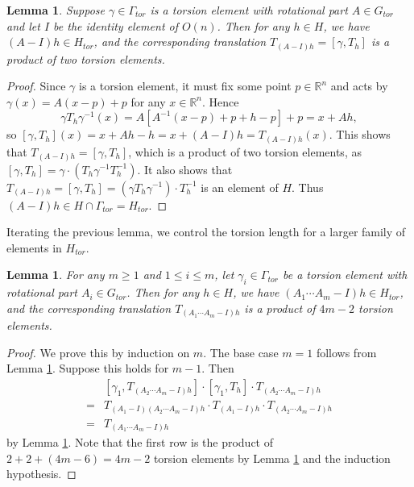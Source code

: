 \documentclass{amsart}
\newtheorem{lemma}[theorem]{Lemma}
\theoremstyle{definition}
\numberwithin{equation}{section}
\theoremstyle{theorem}
\theoremstyle{remark}
\def\R{\mathbb R}
\def\Gt{G_{tor}}
\def\Ht{H_{tor}}
\def\Gat{\Gamma_{tor}}
\begin{document}
	\begin{lemma}\label{lemma: commutator with torsion}
		Suppose $\gamma\in\Gat$ is a torsion element with rotational part $A\in \Gt$ and let $I$ be the identity element of $O(n)$. Then for any $h\in H$, we have $(A-I)h\in \Ht$, and the corresponding translation $T_{(A-I)h}=[\gamma,T_h]$ is a product of two torsion elements.
	\end{lemma}
	\begin{proof}
		Since $\gamma$ is a torsion element, it must fix some point $p\in\R^n$ and acts by
		$\gamma(x)=A(x-p)+p$ for any $x\in\R^n$. Hence
		$$\gamma T_h \gamma^{-1} (x)= A[A^{-1}(x-p) +p+h-p]+p=x+Ah,$$
		so $[\gamma, T_h](x)=x+Ah-h=x+(A-I)h=T_{(A-I)h}(x)$.
		This shows that $T_{(A-I)h}=[\gamma,T_h]$, which is a product of two torsion elements,
		as $[\gamma,T_h]=\gamma\cdot (T_h\gamma^{-1} T_h^{-1})$. 
		It also shows that $T_{(A-I)h}=[\gamma,T_h]=(\gamma T_h \gamma^{-1})\cdot T_h^{-1}$ is an element of $H$.
		Thus $(A-I)h\in H\cap\Gat=\Ht$.
	\end{proof}
	
	Iterating the previous lemma, we control the torsion length for a larger family of elements in $\Ht$.
	
	\begin{lemma}\label{lemma: iterated commutator}
		For any $m\ge1$ and $1\le i\le m$, let $\gamma_i\in \Gat$ be a torsion element with rotational part $A_i\in \Gt$. Then for any $h\in H$, we have $(A_1\cdots A_m-I)h\in \Ht$, and the corresponding translation $T_{(A_1\cdots A_m-I)h}$ is a product of $4m-2$ torsion elements.
	\end{lemma}
	\begin{proof}
		We prove this by induction on $m$. The base case $m=1$ follows from Lemma \ref{lemma: commutator with torsion}. Suppose this holds for $m-1$. Then
		\begin{align*}
			&[\gamma_1,T_{(A_2\cdots A_m-I)h}]\cdot[\gamma_1,T_h]\cdot T_{(A_2\cdots A_m-I)h}\\
			=&T_{(A_1-I)(A_2\cdots A_m-I)h}\cdot T_{(A_1-I)h}\cdot T_{(A_2\cdots A_m-I)h}\\
			=&T_{(A_1\cdots A_m - I)h}
		\end{align*}
		by Lemma \ref{lemma: commutator with torsion}. Note that the first row is the product of $2+2+(4m-6)=4m-2$ torsion elements by Lemma \ref{lemma: commutator with torsion} and the induction hypothesis.
	\end{proof}
	
\end{document}
